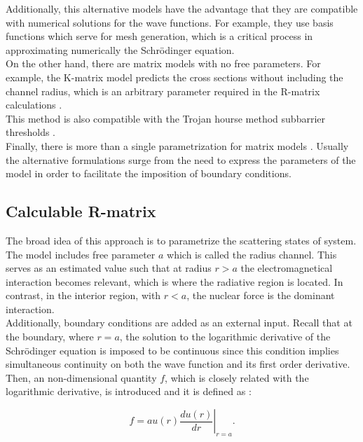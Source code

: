 \documentclass[openany]{book}
\begin{document}
Additionally, this alternative models have the advantage that they are compatible with numerical solutions for the wave functions. For example, they use basis functions which serve for mesh generation, which is a critical process in approximating numerically the Schrödinger equation. \\

On the other hand, there are matrix models with no free parameters. For example, the K-matrix model predicts the cross sections without including the channel radius, which is an arbitrary parameter required in the R-matrix calculations \cite{humblet_1990}. \\

This method is also compatible with the Trojan hourse method subbarrier thresholds \cite{mukhamedzhanov_shubhchintak_bertulani_2017}. \\

Finally, there is more than a single parametrization for matrix models \cite{brune_2002}. Usually the alternative formulations surge from the need to express the parameters of the model in order to facilitate the imposition of boundary conditions.  

\subsection{Calculable R-matrix} \label{sub:rmatrix_calculable}

The broad idea of this approach is to parametrize the scattering states of system.  The model includes free parameter $a$ which is called the radius channel. This serves as an estimated value such that at radius $r > a$ the electromagnetical interaction becomes relevant, which is where the radiative region is located. In contrast, in the interior region, with $r < a$, the nuclear force is the dominant interaction. \\

Additionally, boundary conditions are added as an external input. Recall that at the boundary, where $r = a$, the solution to the logarithmic derivative of the Schrödinger equation is imposed to be continuous since this condition implies simultaneous continuity on both the wave function and its first order derivative. Then, an non-dimensional quantity $f$, which is closely related with the logarithmic derivative, is introduced and it is defined as \cite{iliadis_2015}:

\begin{equation}\label{eq:rmatrix_f}
	f = a\left.u(r) \frac{du(r)}{dr}\right|_{r = a}.
\end{equation}
\end{document}
